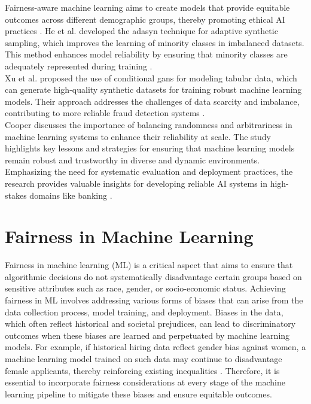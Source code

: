 \documentclass[12pt,a4paper]{report}
\begin{document}
Fairness-aware machine learning aims to create models that provide equitable outcomes across different demographic groups, thereby promoting ethical AI practices \citep[p.1]{corbett2023measure}. He et al. developed the \acrshort{adasyn} technique for adaptive synthetic sampling, which improves the learning of minority classes in imbalanced datasets. This method enhances model reliability by ensuring that minority classes are adequately represented during training \citep[p.1325]{he2008adasyn}.\\

Xu et al. proposed the use of conditional \acrshort{gan}s for modeling tabular data, which can generate high-quality synthetic datasets for training robust machine learning models. Their approach addresses the challenges of data scarcity and imbalance, contributing to more reliable fraud detection systems \citep[p.42]{xu2019modeling}.\\

Cooper discusses the importance of balancing randomness and arbitrariness in machine learning systems to enhance their reliability at scale. The study highlights key lessons and strategies for ensuring that machine learning models remain robust and trustworthy in diverse and dynamic environments. Emphasizing the need for systematic evaluation and deployment practices, the research provides valuable insights for developing reliable AI systems in high-stakes domains like banking \citep{cooper2024between}.

\section{Fairness in Machine Learning}
Fairness in machine learning (ML) is a critical aspect that aims to ensure that algorithmic decisions do not systematically disadvantage certain groups based on sensitive attributes such as race, gender, or socio-economic status. Achieving fairness in ML involves addressing various forms of biases that can arise from the data collection process, model training, and deployment. Biases in the data, which often reflect historical and societal prejudices, can lead to discriminatory outcomes when these biases are learned and perpetuated by machine learning models. For example, if historical hiring data reflect gender bias against women, a machine learning model trained on such data may continue to disadvantage female applicants, thereby reinforcing existing inequalities \citep{barocas2023fairness}. Therefore, it is essential to incorporate fairness considerations at every stage of the machine learning pipeline to mitigate these biases and ensure equitable outcomes.\\
\end{document}
